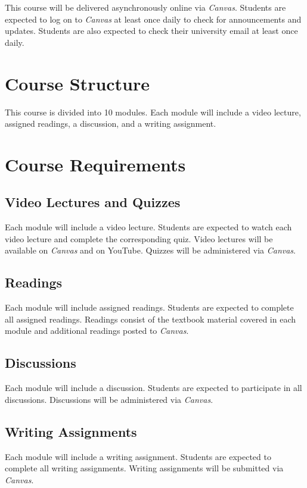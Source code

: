 \documentclass[12pt, letterpaper]{article}
\begin{document}
This course will be delivered asynchronously online via \emph{Canvas}. Students are expected to log on to \emph{Canvas} at least once daily to check for announcements and updates. Students are also expected to check their university email at least once daily.

\section*{Course Structure}

This course is divided into 10 modules. Each module will include a video lecture, assigned readings, a discussion, and a writing assignment. 
\section*{Course Requirements}

\subsection*{Video Lectures and Quizzes}

Each module will include a video lecture. Students are expected to watch each video lecture and complete the corresponding quiz. Video lectures will be available on \emph{Canvas} and on YouTube. Quizzes will be administered via \emph{Canvas}.

\subsection*{Readings}

Each module will include assigned readings. Students are expected to complete all assigned readings. Readings consist of the textbook material covered in each module and additional readings posted to \emph{Canvas}.

\subsection*{Discussions}

Each module will include a discussion. Students are expected to participate in all discussions. Discussions will be administered via \emph{Canvas}.

\subsection*{Writing Assignments}

Each module will include a writing assignment. Students are expected to complete all writing assignments. Writing assignments will be submitted via \emph{Canvas}.
\end{document}
